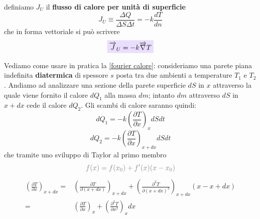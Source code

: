 \documentclass[x11names]{report}
\newcommand{\viola}[1]{\colorbox{yred}{$\displaystyle #1$}}
\begin{document}
	\noindent
	definiamo \(J_U\) il \textbf{flusso di calore per unità di superficie} 
	\[ 
	J_U \equiv \frac{\Delta Q}{\Delta S \Delta t} = - k \frac{dT}{dn}
	\]
	che in forma vettoriale si può scrivere
	\begin{equation}
		\viola{\overrightarrow{J}_U = -k \overrightarrow{\nabla}T}
	\end{equation}
	
	\noindent
	Vediamo come usare in pratica la \ref{fourier calore}: consideriamo una parete piana indefinita \textbf{diatermica} di spessore \(s\) posta tra due ambienti a temperature \(T_1\) e \(T_2\). Andiamo ad analizzare una sezione della parete superficie \(dS\) in \(x\) attraverso la quale viene fornito il calore \(dQ_1\) alla massa \(dm\); intanto \(dm\) attraverso \(dS\) in \(x + dx\) cede il calore \(dQ_2\). Gli scambi di calore saranno quindi:
	\[ 
	dQ_1 = -k \left(\frac{\partial T}{\partial x}\right)_x dS dt
	\]
	\[ 
	dQ_2 = -k \left(\frac{\partial T}{\partial x}\right)_{x+dx} dS dt 
	\]
	che tramite uno sviluppo di Taylor al primo membro
	\[ 
	\textcolor{gray}{f(x) = f(x_0) + f'(x)(x-x_0)}
	\]
	\begin{align*}
		\left(\frac{\partial T}{\partial x}\right)_{x+dx} =& \left(\frac{\partial T}{\partial (x+dx)}\right)_{x+dx} + \left(\frac{\partial^2 T}{\partial (x + dx)^2}\right)_{x+dx}(x - x +dx) \\
		=& \left(\frac{\partial T}{\partial x}\right)_x + \left(\frac{\partial^2 T}{\partial x^2}\right)_{x}dx
	\end{align*}
	
\end{document}
